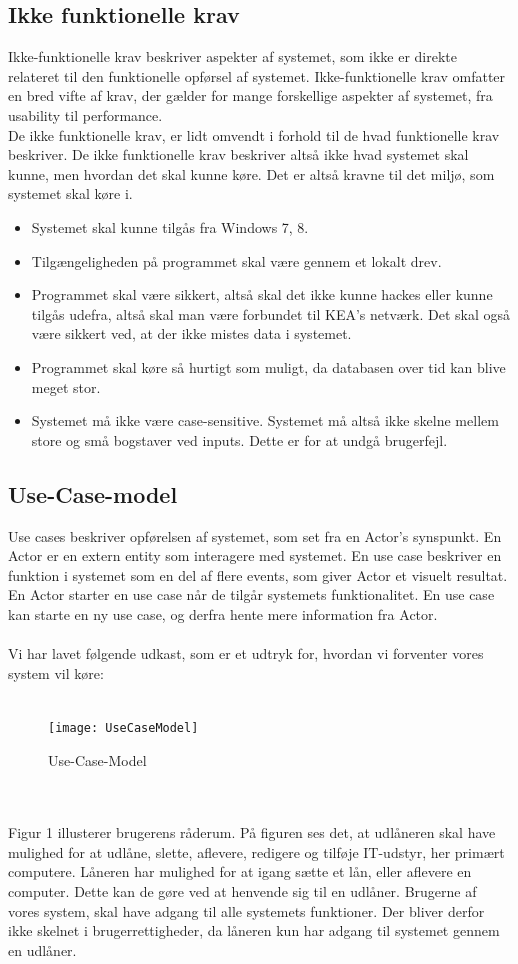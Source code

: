 \documentclass[a4paper]{article}
\begin{document}
\subsection{Ikke funktionelle krav}
Ikke-funktionelle krav beskriver aspekter af systemet, som ikke er direkte relateret til den funktionelle opførsel af systemet. Ikke-funktionelle krav omfatter en bred vifte af krav, der gælder for mange forskellige aspekter af systemet, fra usability til performance. \cite[p119]{OOSE} \\ De ikke funktionelle krav, er lidt omvendt i forhold til de hvad funktionelle krav beskriver. De ikke funktionelle krav beskriver altså ikke hvad systemet skal kunne, men hvordan det skal kunne køre. Det er altså kravne til det miljø, som systemet skal køre i.
\begin{itemize}
	\item Systemet skal kunne tilgås fra Windows 7, 8.
	\item Tilgængeligheden på programmet skal være gennem et lokalt drev.
	\item Programmet skal være sikkert, altså skal det ikke kunne hackes eller kunne tilgås udefra, altså skal man være forbundet til KEA's netværk. Det skal også være sikkert ved, at der ikke mistes data i systemet.
	\item Programmet skal køre så hurtigt som muligt, da databasen over tid kan blive meget stor.
	\item Systemet må ikke være case-sensitive. Systemet må altså ikke skelne mellem store og små bogstaver ved inputs. Dette er for at undgå brugerfejl.
\end{itemize}
\newpage
\subsection{Use-Case-model}
Use cases beskriver opførelsen af systemet, som set fra en Actor’s synspunkt. En Actor er en extern entity som interagere med systemet. En use case beskriver en funktion i systemet som en del af flere events, som giver Actor et visuelt resultat. En Actor starter en use case når de tilgår systemets funktionalitet. En use case kan starte en ny use case, og derfra hente mere information fra Actor.\cite[p~42]{OOSE} \\ \\
Vi har lavet følgende udkast, som er et udtryk for, hvordan vi forventer vores system vil køre:\\ \\
\begin{figure}[h!]
\texttt{[image: UseCaseModel]}
  \caption{Use-Case-Model}
  \centering
\end{figure}  \\ \\
Figur 1 illusterer brugerens råderum. På figuren ses det, at udlåneren skal have mulighed for at udlåne, slette, aflevere, redigere og tilføje IT-udstyr, her primært computere. Låneren har mulighed for at igang sætte et lån, eller aflevere en computer. Dette kan de gøre ved at henvende sig til en udlåner. Brugerne af vores system, skal have adgang til alle systemets funktioner. Der bliver derfor ikke skelnet i brugerrettigheder, da låneren kun har adgang til systemet gennem en udlåner.
\newpage
\end{document}
